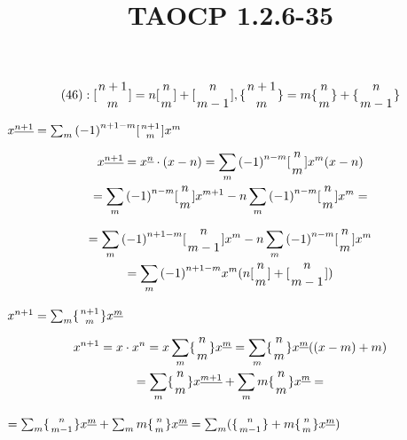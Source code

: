 \documentclass{article}
\title{TAOCP 1.2.6\mbox{-}35}
\begin{document}
\maketitle

\[ (46): [{{n+1}\atop m}] = n[{{n}\atop m}] + [{{n}\atop{m-1}}], \{{{n+1}\atop m}\} = m\{{{n}\atop m}\} + \{{{n}\atop{m-1}}\} \]

\( x^{\underline{n+1}} = \sum_{m} {(-1)}^{n+1-m} [{{n+1}\atop m}] x^{m} \)

\begin{multline*}
x^{\underline{n+1}} = x^{\underline{n}} \cdot (x-n) = \sum_{m} {(-1)}^{n-m} [{{n}\atop m}] x^{m} (x-n) \\
= \sum_{m} {(-1)}^{n-m} [{{n}\atop m}] x^{m+1} -n \sum_{m} {(-1)}^{n-m} [{{n}\atop m}]x^{m} =
\end{multline*}

\begin{multline*}
= \sum_{m} {(-1)}^{n+1-m} [{{n}\atop {m-1}}] x^{m} -n \sum_{m} {(-1)}^{n-m} [{{n}\atop m}]x^{m} \\
= \sum_{m} {(-1)}^{n+1-m}x^{m}(n[{{n}\atop m}] + [{{n}\atop {m-1}}])
\end{multline*}

\( x^{n+1} = \sum_{m} \{{{n+1}\atop m}\} x^{\underline{m}} \)

\begin{multline*}
x^{n+1} = x \cdot x^{n} = x \sum_{m} \{{{n}\atop m}\} x^{\underline{m}} = \sum_{m} \{{{n}\atop m}\} x^{\underline{m}} ((x-m)+m) \\
= \sum_{m} \{{{n}\atop m}\} x^{\underline{m+1}} + \sum_{m} m\{{{n}\atop m}\}x^{\underline{m}} =
\end{multline*}

\( = \sum_{m} \{{{n}\atop {m-1}}\} x^{\underline{m}} + \sum_{m} m\{{{n}\atop m}\}x^{\underline{m}} = \sum_{m}(\{{{n}\atop {m-1}}\} + m\{{{n}\atop m}\}x^{\underline{m}}) \)
\end{document}
